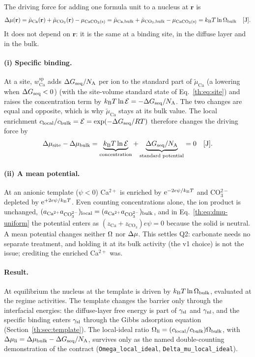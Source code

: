 The driving force for adding one formula unit to a nucleus at $\mathbf r$ is
\begin{equation}\label{th:eq:dmu-uniform}
\Delta\mu(\mathbf r)=\tilde\mu_\mathrm{Ca}(\mathbf r)+\tilde\mu_{\mathrm{CO_3}}(\mathbf r)-\mu_\mathrm{CaCO_3(s)}
=\tilde\mu_\mathrm{Ca,bulk}+\tilde\mu_\mathrm{CO_3,bulk}-\mu_\mathrm{CaCO_3(s)}=k_\mathrm{B} T\ln\Omega_\mathrm{bulk} \quad[\mathrm{J}].
\end{equation}
It does not depend on $\mathbf r$: it is the same at a binding site, in the diffuse layer and in
the bulk.

\paragraph{(i) Specific binding.} At a site, $w_\mathrm{Ca}^\mathrm{sp}$ adds $\Delta G_\mathrm{seq}/N_\mathrm{A}$ per ion to the
standard part of $\tilde\mu_\mathrm{Ca}$ (a lowering when $\Delta G_\mathrm{seq}<0$) (with the site-volume standard state of
Eq.~\eqref{th:eq:site}) and raises the concentration term by $k_\mathrm{B} T\ln\mathcal{E}=-\Delta G_\mathrm{seq}/N_\mathrm{A}$. The two
changes are equal and opposite, which is why $\tilde\mu_\mathrm{Ca}$ stays at its bulk value. The
local enrichment $c_\mathrm{local}/c_\mathrm{bulk}=\mathcal{E}=\exp(-\Delta G_\mathrm{seq}/R T)$ therefore changes the driving force by
\begin{equation}\label{th:eq:no-gain}
\Delta\mu_\mathrm{site}-\Delta\mu_\mathrm{bulk}=\underbrace{k_\mathrm{B} T\ln\mathcal{E}}_{\text{concentration}}+\underbrace{\Delta G_\mathrm{seq}/N_\mathrm{A}}_{\text{standard potential}}=0 \quad[\mathrm{J}].
\end{equation}

\paragraph{(ii) A mean potential.} At an anionic template ($\psi<0$) Ca$^{2+}$ is enriched by
$\mathrm{e}^{-2e\psi/k_\mathrm{B} T}$ and CO$_3^{2-}$ depleted by $\mathrm{e}^{+2e\psi/k_\mathrm{B} T}$. Even counting concentrations
alone, the ion product is unchanged, $(a_{\mathrm{Ca}^{2+}}a_{\mathrm{CO}_3^{2-}})_\mathrm{local}=(a_{\mathrm{Ca}^{2+}}a_{\mathrm{CO}_3^{2-}})_\mathrm{bulk}$, and in
Eq.~\eqref{th:eq:dmu-uniform} the potential enters as $(z_\mathrm{Ca}+z_\mathrm{CO_3})e\psi=0$
because the solid is neutral. A mean potential changes neither $\Omega$ nor $\Delta\mu$. This settles
Q2: carbonate needs no separate treatment, and holding it at its bulk activity (the v1 choice) is
not the issue; crediting the enriched Ca$^{2+}$ was.

\paragraph{Result.} At equilibrium the nucleus at the template is driven by $k_\mathrm{B} T\ln\Omega_\mathrm{bulk}$,
evaluated at the regime activities. The template changes the barrier only through the
interfacial energies: the diffuse-layer free energy is part of $\gamma_\mathrm{sl}$ and $\gamma_\mathrm{nl}$, and the specific
binding enters $\gamma_\mathrm{sl}$ through the Gibbs adsorption equation (Section~\ref{th:sec:template}).
The local-ideal ratio $\Omega_\mathrm{li}=(c_\mathrm{local}/c_\mathrm{bulk})\Omega_\mathrm{bulk}$, with
$\Delta\mu_\mathrm{li}=\Delta\mu_\mathrm{bulk}-\Delta G_\mathrm{seq}/N_\mathrm{A}$, survives only as the named double-counting
demonstration of the contract (\texttt{Omega\_local\_ideal}, \texttt{Delta\_mu\_local\_ideal}).

